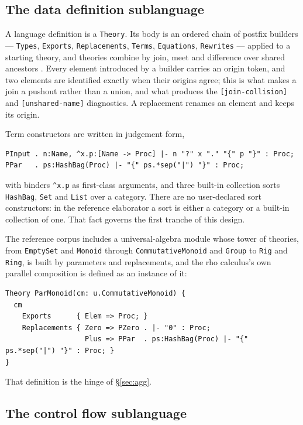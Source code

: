 \documentclass[11pt]{article}
\theoremstyle{branddef}
\theoremstyle{brandplain}
\theoremstyle{brandrem}
\newcommand{\rhoc}{\textsf{rho}}
\begin{document}
\subsection{The data definition sublanguage}

A language definition is a \texttt{Theory}. Its body is an ordered chain of
postfix builders --- \texttt{Types}, \texttt{Exports}, \texttt{Replacements},
\texttt{Terms}, \texttt{Equations}, \texttt{Rewrites} --- applied to a starting
theory, and theories combine by join, meet and difference over shared ancestors
\cite{modulesyntax}. Every element introduced by a builder carries an origin
token, and two elements are identified exactly when their origins agree; this is
what makes a join a pushout rather than a union, and what produces the
\texttt{[join-collision]} and \texttt{[unshared-name]} diagnostics. A
replacement renames an element and keeps its origin.

Term constructors are written in judgement form,
\begin{lstlisting}[language=mettail]
PInput . n:Name, ^x.p:[Name -> Proc] |- n "?" x "." "{" p "}" : Proc;
PPar   . ps:HashBag(Proc) |- "{" ps.*sep("|") "}" : Proc;
\end{lstlisting}
with binders \verb|^x.p| as first-class arguments, and three built-in
collection sorts \texttt{HashBag}, \texttt{Set} and \texttt{List} over a
category. There are no user-declared sort constructors: in the reference
elaborator a sort is either a category or a built-in collection of one. That
fact governs the first tranche of this design.

The reference corpus includes a universal-algebra module whose tower of
theories, from \texttt{EmptySet} and \texttt{Monoid} through
\texttt{CommutativeMonoid} and \texttt{Group} to \texttt{Rig} and
\texttt{Ring}, is built
by parameters and replacements, and the \rhoc{} calculus's own parallel
composition is defined as an instance of it:
\begin{lstlisting}[language=mettail]
Theory ParMonoid(cm: u.CommutativeMonoid) {
  cm
    Exports      { Elem => Proc; }
    Replacements { Zero => PZero . |- "0" : Proc;
                   Plus => PPar  . ps:HashBag(Proc) |- "{" ps.*sep("|") "}" : Proc; }
}
\end{lstlisting}
That definition is the hinge of \S\ref{sec:agg}.

\subsection{The control flow sublanguage}
\end{document}
